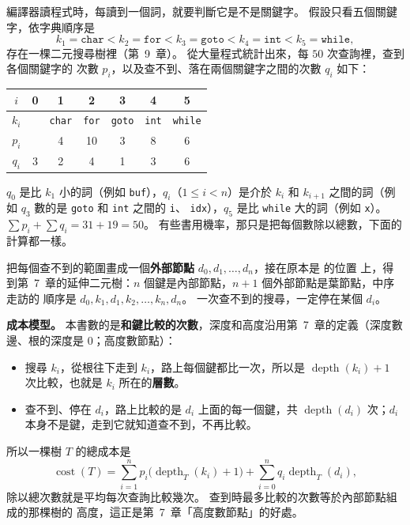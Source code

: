 編譯器讀程式時，每讀到一個詞，就要判斷它是不是關鍵字。 假設只看五個關鍵字，依字典順序是
\[
k_1 = \texttt{char} < k_2 = \texttt{for} < k_3 = \texttt{goto} < k_4 = \texttt{int}
< k_5 = \texttt{while},
\]
存在一棵二元搜尋樹裡（第~9~章）。 從大量程式統計出來，每 $50$ 次查詢裡，查到各個關鍵字的
次數 $p_i$，以及查不到、落在兩個關鍵字之間的次數 $q_i$ 如下：

\begin{center}
\begin{tabular}{c*{6}{c}}
\toprule
$i$ & 0 & 1 & 2 & 3 & 4 & 5 \\
\midrule
$k_i$ & & \texttt{char} & \texttt{for} & \texttt{goto} & \texttt{int} & \texttt{while} \\
$p_i$ & & 4 & 10 & 3 & 8 & 6 \\
$q_i$ & 3 & 2 & 4 & 1 & 3 & 6 \\
\bottomrule
\end{tabular}
\end{center}

$q_0$ 是比 $k_1$ 小的詞（例如 \texttt{buf}），$q_i$（$1 \le i < n$）是介於 $k_i$ 和
$k_{i+1}$ 之間的詞（例如 $q_3$ 數的是 \texttt{goto} 和 \texttt{int} 之間的 \texttt{i}、
\texttt{idx}），$q_5$ 是比 \texttt{while} 大的詞（例如 \texttt{x}）。 $\sum p_i + \sum q_i
= 31 + 19 = 50$。 有些書用機率，那只是把每個數除以總數，下面的計算都一樣。

把每個查不到的範圍畫成一個\textbf{外部節點} $d_0, d_1, \ldots, d_n$，接在原本是 \NIL 的位置
上，得到第~7~章的延伸二元樹：$n$ 個鍵是內部節點，$n + 1$ 個外部節點是葉節點，中序走訪的
順序是 $d_0, k_1, d_1, k_2, \ldots, k_n, d_n$。 一次查不到的搜尋，一定停在某個 $d_i$。

\textbf{成本模型。} 本書數的是\textbf{和鍵比較的次數}，深度和高度沿用第~7~章的定義（深度數
邊、根的深度是 $0$；高度數節點）：
\begin{itemize}
\item 搜尋 $k_i$，從根往下走到 $k_i$，路上每個鍵都比一次，所以是 $\operatorname{depth}(k_i)
+ 1$ 次比較，也就是 $k_i$ 所在的\textbf{層數}。
\item 查不到、停在 $d_i$，路上比較的是 $d_i$ 上面的每一個鍵，共 $\operatorname{depth}(d_i)$
次；$d_i$ 本身不是鍵，走到它就知道查不到，不再比較。
\end{itemize}
所以一棵樹 $T$ 的總成本是
\[
\operatorname{cost}(T) = \sum_{i=1}^{n} p_i \bigl(\operatorname{depth}_T(k_i) + 1\bigr)
+ \sum_{i=0}^{n} q_i \operatorname{depth}_T(d_i) ,
\]
除以總次數就是平均每次查詢比較幾次。 查到時最多比較的次數等於內部節點組成的那棵樹的
高度，這正是第~7~章「高度數節點」的好處。

